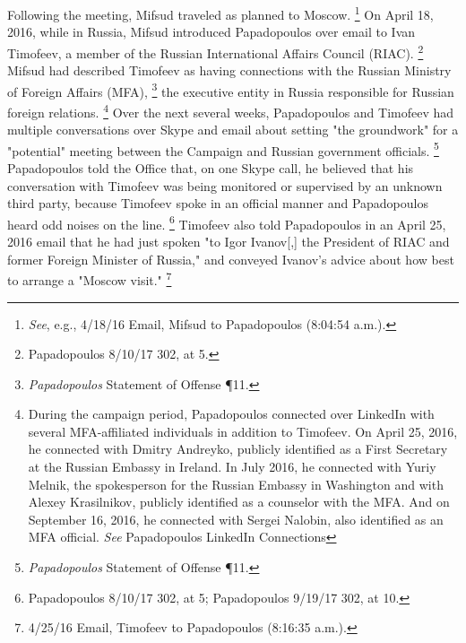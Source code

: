 Following the meeting, Mifsud traveled as planned to Moscow.%
\footnote{\textit{See}, e.g., 4/18/16 Email, Mifsud to Papadopoulos (8:04:54 a.m.).}
On April 18, 2016, while in Russia, Mifsud introduced Papadopoulos over email to Ivan Timofeev, a member of the Russian International Affairs Council (RIAC).%
\footnote{Papadopoulos 8/10/17 302, at 5.}
Mifsud had described Timofeev as having connections with the Russian Ministry of Foreign Affairs (MFA),%
\footnote{\textit{Papadopoulos} Statement of Offense \P 11.}
the executive entity in Russia responsible for Russian foreign relations.%
\footnote{During the campaign period, Papadopoulos connected over LinkedIn with several MFA-affiliated individuals in addition to Timofeev.
On April 25, 2016, he connected with Dmitry Andreyko, publicly identified as a First Secretary at the Russian Embassy in Ireland.
In July 2016, he connected with Yuriy Melnik, the spokesperson for the Russian Embassy in Washington and with Alexey Krasilnikov, publicly identified as a counselor with the MFA.
And on September 16, 2016, he connected with Sergei Nalobin, also identified as an MFA official.
\textit{See} Papadopoulos LinkedIn Connections }
Over the next several weeks, Papadopoulos and Timofeev had multiple conversations over Skype and email about setting "the groundwork" for a "potential" meeting between the Campaign and Russian government officials.%
\footnote{\textit{Papadopoulos} Statement of Offense \P 11.}
Papadopoulos told the Office that, on one Skype call, he believed that his conversation with Timofeev was being monitored or supervised by an unknown third party, because Timofeev spoke in an official manner and Papadopoulos heard odd noises on the line.%
\footnote{Papadopoulos 8/10/17 302, at 5; Papadopoulos 9/19/17 302, at 10.}
Timofeev also told Papadopoulos in an April 25, 2016 email that he had just spoken "to Igor Ivanov[,] the President of RIAC and former Foreign Minister of Russia," and conveyed Ivanov's advice about how best to arrange a "Moscow visit."%
\footnote{4/25/16 Email, Timofeev to Papadopoulos (8:16:35 a.m.).}

